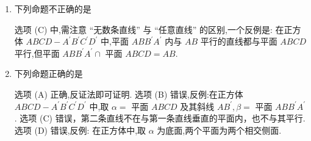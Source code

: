 \begin{enumerate}
    \item 下列命题不正确的是
    \begin{jieda}
        选项 (C) 中,需注意 “无数条直线” 与 “任意直线” 的区别,一个反例是: 在正方体 ${ABCD} - {A}^{\prime }{B}^{\prime }{C}^{\prime }{D}^{\prime }$ 中,平面 ${AB}{B}^{\prime }{A}^{\prime }$ 内与 ${AB}$ 平行的直线都与平面 ${ABCD}$ 平行,但平面 ${AB}{B}^{\prime }{A}^{\prime } \cap$ 平面 ${ABCD} = {AB}$.
    \end{jieda}

    \item 下列命题正确的是
    \begin{jieda}
        选项 (A) 正确,反证法即可证明. 选项 (B) 错误,反例:在正方体 ${ABCD} - {A}^{\prime }{B}^{\prime }{C}^{\prime }{D}^{\prime }$ 中,取 $\alpha  =$ 平面 ${ABCD}$ 及其斜线 $A{B}^{\prime },\beta  =$ 平面 ${AB}{B}^{\prime }{A}^{\prime }$. 选项 (C) 错误，第二条直线不在与第一条直线垂直的平面内，也不与其平行. 选项 (D) 错误,反例: 在正方体中,取 $\alpha$ 为底面,两个平面为两个相交侧面.
    \end{jieda}


\end{enumerate}

